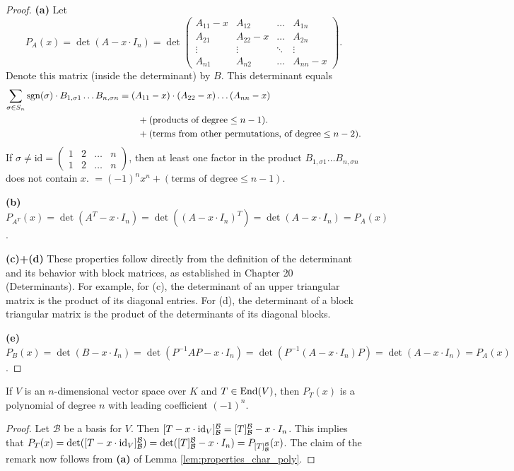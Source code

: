 \begin{proof}
  \textbf{(a)} Let
  \[P_A(x) = \det(A - x \cdot I_n) = \det\begin{pmatrix} A_{11}-x & A_{12} & \dots & A_{1n} \\ A_{21} & A_{22}-x & \dots & A_{2n} \\ \vdots & \vdots & \ddots & \vdots \\ A_{n1} & A_{n2} & \dots & A_{nn}-x \end{pmatrix}. \]
  Denote this matrix (inside the determinant) by $B$. This determinant equals 
  \begin{align*}
    \sum_{\sigma \in S_n} \operatorname{sgn}(\sigma) \cdot B_{1, \sigma 1} \dots B_{n, \sigma n} 
    & = (A_{11}-x) \cdot (A_{22}-x) \dots (A_{nn}-x) \\
    & \qquad + (\text{products of degree} \le n-1). \\
    & \qquad + (\text{terms from other permutations, of degree} \le n-2).
  \end{align*}
  If $\sigma \ne \mathrm{id} = \left(\begin{smallmatrix} 1 & 2 & \dots & n \\ 1 & 2 & \dots & n \end{smallmatrix}\right)$, then at least one factor in the product $B_{1, \sigma 1} \dots B_{n, \sigma n}$ does not contain $x$.
  $= (-1)^n x^n + (\text{terms of degree} \le n-1)$.

  \textbf{(b)} $P_{A^T}(x) = \det(A^T - x \cdot I_n) = \det((A - x \cdot I_n)^T) = \det(A - x \cdot I_n) = P_A(x)$.

  \textbf{(c)+(d)} These properties follow directly from the definition of the determinant and its behavior with block matrices, as established in Chapter 20 (Determinants). For example, for (c), the determinant of an upper triangular matrix is the product of its diagonal entries. For (d), the determinant of a block triangular matrix is the product of the determinants of its diagonal blocks.

  \textbf{(e)} $P_B(x) = \det(B - x \cdot I_n) = \det(P^{-1}AP - x \cdot I_n) = \det(P^{-1}(A - x \cdot I_n)P) = \det(A - x \cdot I_n) = P_A(x)$.
\end{proof}

\begin{remark}\label{rem:char_poly_degree}
  If $V$ is an $n$-di\-men\-sional vector space over $K$ and $T \in \operatorname{End}(V)$, then $P_T(x)$ is a polynomial of degree $n$ with leading coefficient $(-1)^n$.
\end{remark}
\begin{proof}
  Let $\mathcal{B}$ be a basis for $V$. Then $[T - x \cdot \operatorname{id}_V]_{\mathcal{B}}^{\mathcal{B}} = [T]_{\mathcal{B}}^{\mathcal{B}} - x \cdot I_n$. This implies that $P_T(x) = \det([T - x \cdot \operatorname{id}_V]_{\mathcal{B}}^{\mathcal{B}}) = \det([T]_{\mathcal{B}}^{\mathcal{B}} - x \cdot I_n) = P_{[T]_{\mathcal{B}}^{\mathcal{B}}}(x)$. The claim of the remark now follows from \textbf{(a)} of Lemma \ref{lem:properties_char_poly}.
\end{proof}

